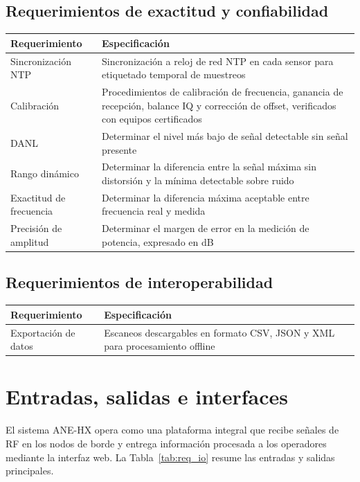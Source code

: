 \subsection{Requerimientos de exactitud y confiabilidad}

\begin{tabularx}{\textwidth}{@{}l X@{}}
\toprule
Requerimiento & Especificación \\
\midrule
Sincronización NTP & Sincronización a reloj de red NTP en cada sensor para etiquetado temporal de muestreos \\
Calibración & Procedimientos de calibración de frecuencia, ganancia de recepción, balance IQ y corrección de offset, verificados con equipos certificados \\
DANL & Determinar el nivel más bajo de señal detectable sin señal presente \\
Rango dinámico & Determinar la diferencia entre la señal máxima sin distorsión y la mínima detectable sobre ruido \\
Exactitud de frecuencia & Determinar la diferencia máxima aceptable entre frecuencia real y medida \\
Precisión de amplitud & Determinar el margen de error en la medición de potencia, expresado en dB \\
\bottomrule
\end{tabularx}

\subsection{Requerimientos de interoperabilidad}

\begin{tabularx}{\textwidth}{@{}l X@{}}
\toprule
Requerimiento & Especificación \\
\midrule
Exportación de datos & Escaneos descargables en formato CSV, JSON y XML para procesamiento offline \\
\bottomrule
\end{tabularx}

\section{Entradas, salidas e interfaces}

El sistema ANE-HX opera como una plataforma integral que recibe señales de RF en los nodos de borde y entrega información procesada a los operadores mediante la interfaz web. La Tabla~\ref{tab:req_io} resume las entradas y salidas principales.

